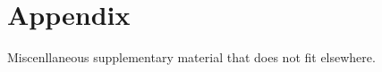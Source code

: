 \chapter{Appendix}\label{appendix}

Miscenllaneous supplementary material that does not fit elsewhere.





%


%
